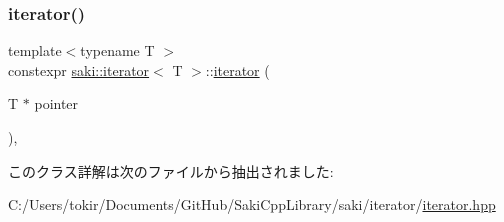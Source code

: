 \subsubsection{\texorpdfstring{iterator()}{iterator()}}
{\footnotesize\ttfamily template$<$typename T $>$ \\
constexpr \mbox{\hyperlink{classsaki_1_1iterator}{saki\+::iterator}}$<$ T $>$\+::\mbox{\hyperlink{classsaki_1_1iterator}{iterator}} (\begin{DoxyParamCaption}\item[{T $\ast$}]{pointer }\end{DoxyParamCaption})\hspace{0.3cm}{\ttfamily [inline]}, {\ttfamily [explicit]}}



このクラス詳解は次のファイルから抽出されました\+:\begin{DoxyCompactItemize}
\item 
C\+:/\+Users/tokir/\+Documents/\+Git\+Hub/\+Saki\+Cpp\+Library/saki/iterator/\mbox{\hyperlink{iterator_2iterator_8hpp}{iterator.\+hpp}}\end{DoxyCompactItemize}
